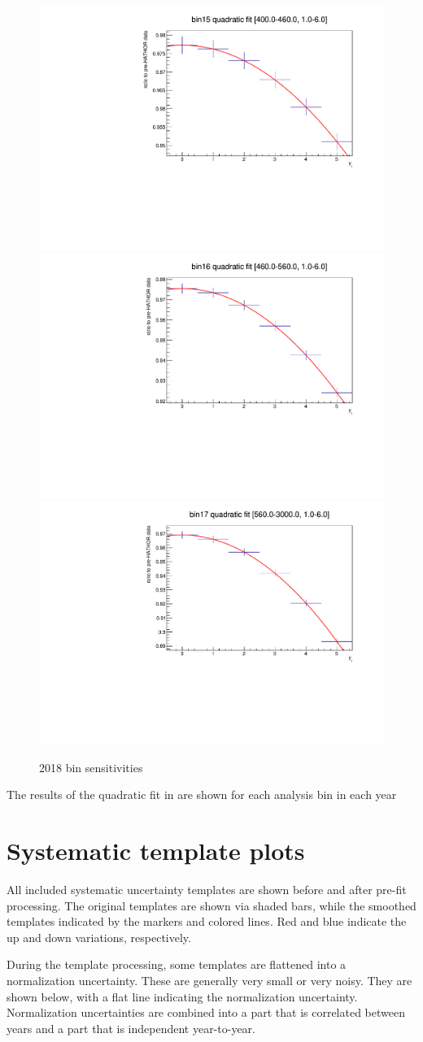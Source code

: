 \begin{figure}
\includegraphics[width=.32\linewidth]{quadplots/2018bin15.pdf}
\includegraphics[width=.32\linewidth]{quadplots/2018bin16.pdf}
\includegraphics[width=.32\linewidth]{quadplots/2018bin17.pdf}
\caption{2018 bin sensitivities}
\label{fig:2018bins}
\end{figure}

\label{S:bins}
The results of the quadratic fit in \yt are shown for each analysis bin in each year

\section{Systematic template plots}
\label{S:templates}

All included systematic uncertainty templates are shown before and after pre-fit processing. The original templates are shown via shaded bars, while the smoothed templates indicated by the markers and colored lines. Red and blue indicate the up and down variations, respectively. 

During the template processing, some templates are flattened into a normalization uncertainty. These are generally very small or very noisy. They are shown below, with a flat line indicating the normalization uncertainty. Normalization uncertainties are combined into a part that is correlated between years and a part that is independent year-to-year. 

\clearpage

